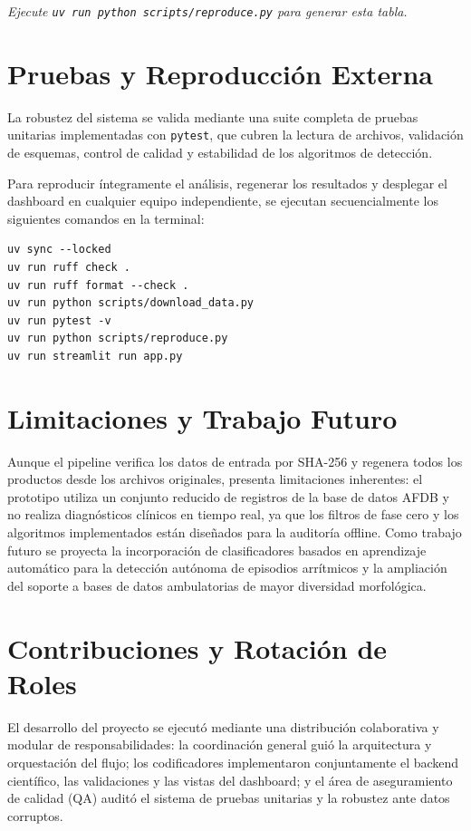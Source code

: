 \documentclass[11pt,a4paper]{article}
\begin{document}
  {}
  {\textit{Ejecute \texttt{uv run python scripts/reproduce.py} para
   generar esta tabla.}}

\section{Pruebas y Reproducción Externa}
La robustez del sistema se valida mediante una suite completa de pruebas unitarias implementadas con \texttt{pytest}, que cubren la lectura de archivos, validación de esquemas, control de calidad y estabilidad de los algoritmos de detección. 

Para reproducir íntegramente el análisis, regenerar los resultados y desplegar el dashboard en cualquier equipo independiente, se ejecutan secuencialmente los siguientes comandos en la terminal:

\begin{verbatim}
uv sync --locked
uv run ruff check .
uv run ruff format --check .
uv run python scripts/download_data.py
uv run pytest -v
uv run python scripts/reproduce.py
uv run streamlit run app.py
\end{verbatim}

\section{Limitaciones y Trabajo Futuro}
Aunque el pipeline verifica los datos de entrada por SHA-256 y regenera todos los productos desde los archivos originales, presenta limitaciones inherentes: el prototipo utiliza un conjunto reducido de registros de la base de datos AFDB y no realiza diagnósticos clínicos en tiempo real, ya que los filtros de fase cero y los algoritmos implementados están diseñados para la auditoría offline. Como trabajo futuro se proyecta la incorporación de clasificadores basados en aprendizaje automático para la detección autónoma de episodios arrítmicos y la ampliación del soporte a bases de datos ambulatorias de mayor diversidad morfológica.

\section{Contribuciones y Rotación de Roles}
El desarrollo del proyecto se ejecutó mediante una distribución colaborativa y modular de responsabilidades: la coordinación general guió la arquitectura y orquestación del flujo; los codificadores implementaron conjuntamente el backend científico, las validaciones y las vistas del dashboard; y el área de aseguramiento de calidad (QA) auditó el sistema de pruebas unitarias y la robustez ante datos corruptos.
\end{document}

